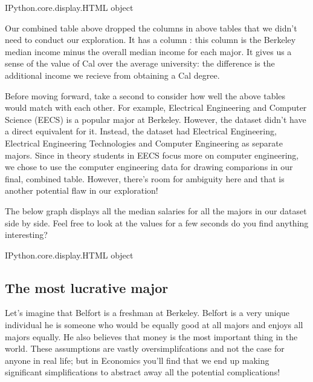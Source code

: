 \documentclass[letterpaper,10pt,english]{jupyterBook}
\begin{document}
\begin{sphinxVerbatim}[commandchars=\\\{\}]
\PYGZlt{}IPython.core.display.HTML object\PYGZgt{}
\end{sphinxVerbatim}

\sphinxAtStartPar
Our combined table above dropped the columns in above tables that we didn’t need to conduct our exploration.
It has a column : this column is the Berkeley median income minus the overall median income for each major.
It gives us a sense of the value of Cal over the average university: the difference is the additional income we recieve from obtaining a Cal degree.

\sphinxAtStartPar
Before moving forward, take a second to consider how well the above tables would match with each other.
For example, Electrical Engineering and Computer Science (EECS) is a popular major at Berkeley. However, the  dataset didn’t have a direct equivalent for it.
Instead, the  dataset had Electrical Engineering, Electrical Engineering Technologies and Computer Engineering as separate majors.
Since in theory students in EECS focus more on computer engineering, we chose to use the computer engineering data for drawing comparions in our final, combined table.
However, there’s room for ambiguity here and that is another potential flaw in our exploration!

\sphinxAtStartPar
The below graph displays all the median salaries for all the majors in our dataset side by side. Feel free to look at the values for a few seconds \sphinxhyphen{} do you find anything interesting?

\begin{sphinxVerbatim}[commandchars=\\\{\}]
\PYGZlt{}IPython.core.display.HTML object\PYGZgt{}
\end{sphinxVerbatim}


\subsection{The most lucrative major}
\label{\detokenize{content/00-intro/index:the-most-lucrative-major}}
\sphinxAtStartPar
Let’s imagine that Belfort is a freshman at Berkeley.
Belfort is a very unique individual \sphinxhyphen{} he is someone who would be equally good at all majors and enjoys all majors equally.
He also believes that money is the most important thing in the world.
These assumptions are vastly oversimplifcations and not the case for anyone in real life; but in Economics you’ll find that we end up making significant simplifications to abstract away all the potential complications!
\end{document}
